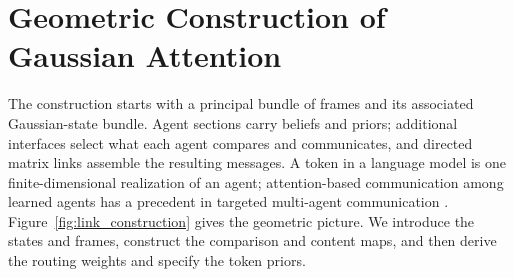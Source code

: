 \documentclass[twoside,11pt]{article}
\begin{document}
\section{Geometric Construction of Gaussian Attention}
\label{sec:construction_overview}

The construction starts with a principal bundle of frames and its associated Gaussian-state bundle. Agent sections carry beliefs and priors; additional interfaces select what each agent compares and communicates, and directed matrix links assemble the resulting messages. A token in a language model is one finite-dimensional realization of an agent; attention-based communication among learned agents has a precedent in targeted multi-agent communication \citep{Das2019TarMAC}. Figure~\ref{fig:link_construction} gives the geometric picture. We introduce the states and frames, construct the comparison and content maps, and then derive the routing weights and specify the token priors.
\end{document}
